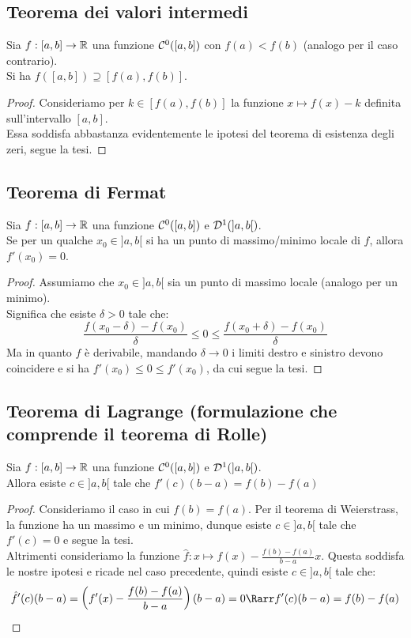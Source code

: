 \documentclass{article}
\begin{document}
\subsection{Teorema dei valori intermedi}

\begin{theorem}{}{}
    Sia $f : [a,b] \to \mathbb{R}$ una funzione $\mathcal{C}^0([a,b])$ con $f(a) < f(b)$ (analogo per il caso contrario).\\
    Si ha $f([a,b]) \supseteq [f(a), f(b)]$.
\end{theorem}
\begin{proof}
    Consideriamo per $k \in [f(a), f(b)]$ la funzione $x \mapsto f(x)-k$ definita sull'intervallo $[a,b]$.\\
    Essa soddisfa abbastanza evidentemente le ipotesi del teorema di esistenza degli zeri, segue la tesi.
\end{proof}

\subsection{Teorema di Fermat}

\begin{theorem}{}{}
    Sia $f : [a,b] \to \mathbb{R}$ una funzione $\mathcal{C}^0([a,b])$ e $\mathcal{D}^1(]a,b[)$.\\
    Se per un qualche $x_0 \in ]a,b[$ si ha un punto di massimo/minimo locale di $f$, allora $f'(x_0)=0$.
\end{theorem}
\begin{proof}
    Assumiamo che $x_0 \in ]a,b[$ sia un punto di massimo locale (analogo per un minimo).\\
    Significa che esiste $\delta>0$ tale che:
    \[\frac{f(x_0 - \delta) - f(x_0)}{\delta} \le 0 \le \frac{f(x_0 + \delta) - f(x_0)}{\delta}\]
    Ma in quanto $f$ è derivabile, mandando $\delta\to 0$ i limiti destro e sinistro devono coincidere e si ha $f'(x_0)\le 0\le f'(x_0)$, da cui segue la tesi. 
\end{proof}

\subsection{Teorema di Lagrange (formulazione che comprende il teorema di Rolle)}

\begin{theorem}{}{}
    Sia $f : [a,b] \to \mathbb{R}$ una funzione $\mathcal{C}^0([a,b])$ e $\mathcal{D}^1(]a,b[)$.\\
    Allora esiste  $c \in ]a,b[$ tale che $f'(c)(b-a) = f(b)-f(a)$
\end{theorem}
\begin{proof}
    Consideriamo il caso in cui $f(b)=f(a)$. Per il teorema di Weierstrass, la funzione ha un massimo e un minimo, dunque esiste $c \in ]a,b[$ tale che $f'(c) = 0$ e segue la tesi.\\
    Altrimenti consideriamo la funzione $\hat{f} : x \mapsto f(x) - \frac{f(b)-f(a)}{b-a}x$. Questa soddisfa le nostre ipotesi e ricade nel caso precedente, quindi esiste $c \in ]a,b[$ tale che:
    \[\hat{f}'(c)(b-a) = \left(f'(x) - \frac{f(b)-f(a)}{b-a}\right)(b-a)=0 \Rarr f'(c)(b-a) = f(b)-f(a)\]
\end{proof}
\end{document}
